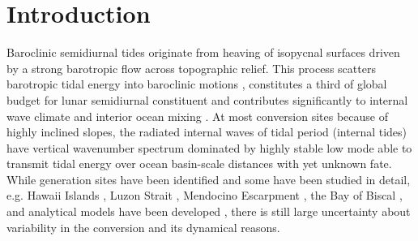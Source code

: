 \documentclass[12pt]{article}
\begin{document}
\section{Introduction}
Baroclinic semidiurnal tides originate from heaving of isopycnal surfaces driven by a strong 
barotropic flow across topographic relief. This process scatters barotropic tidal 
energy into baroclinic motions \citep{hendershott1981long}, constitutes a 
third of global budget for lunar semidiurnal constituent \citep{egbert2000significant, 
munk1997once} and contributes significantly to internal wave climate \citep{wunsch1975deep} and 
interior ocean mixing \citep{wunsch2004vertical}. At most conversion sites because of highly 
inclined slopes, the radiated 
internal waves of tidal period (internal tides) have vertical wavenumber spectrum dominated by 
highly stable low mode \citep{st2002role} able to transmit tidal energy over ocean basin-scale 
distances \citep{zhao2016global} with yet unknown fate. While generation sites have been identified 
\citep{morozov1995semidiurnal, simmons2004internal, arbic2010concurrent} and some have been 
studied in detail, e.g. Hawaii Islands \citep{rudnick2003tides}, Luzon Strait 
\citep{alford2015formation}, Mendocino Escarpment \citep{althaus2003internal}, 
the Bay of Biscal 
\citep{gerkema2004internal}, and analytical models have been developed \citep{garrett2007internal}, 
there is still large uncertainty about variability in the conversion and its dynamical reasons.\\
\end{document}
